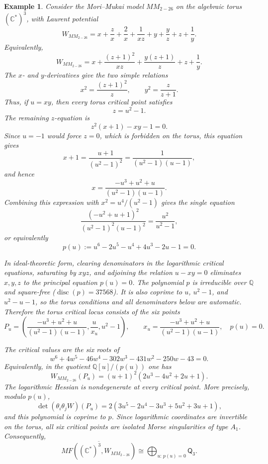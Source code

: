 \documentclass[11pt]{amsart}
\newtheorem{example}{Example}[section]
\newcommand{\MorseCat}[1]{\mathsf{Q}_{#1}}
\begin{document}
\begin{example}
Consider the Mori--Mukai model $MM_{2-26}$ on the algebraic torus
$(\mathbb{C}^*)^3$, with Laurent potential
\[
W_{MM_{2-26}}=x+\frac{z}{x}+\frac{2}{x}+\frac{1}{xz}
+y+\frac{y}{z}+z+\frac{1}{y}.
\]
Equivalently,
\[
W_{MM_{2-26}}
=x+\frac{(z+1)^2}{xz}+\frac{y(z+1)}{z}+z+\frac{1}{y}.
\]
The $x$- and $y$-derivatives give the two simple relations
\[
x^2=\frac{(z+1)^2}{z},
\qquad
y^2=\frac{z}{z+1}.
\]
Thus, if $u=xy$, then every torus critical point satisfies
\[
z=u^2-1.
\]
The remaining $z$-equation is
\[
z^2(x+1)-xy-1=0.
\]
Since $u=-1$ would force $z=0$, which is forbidden on the torus, this equation
gives
\[
x+1=\frac{u+1}{(u^2-1)^2}
=\frac{1}{(u^2-1)(u-1)},
\]
and hence
\[
x=\frac{-u^3+u^2+u}{(u^2-1)(u-1)}.
\]
Combining this expression with $x^2=u^4/(u^2-1)$ gives the single equation
\[
\frac{(-u^2+u+1)^2}{(u^2-1)^2(u-1)^2}
=\frac{u^2}{u^2-1},
\]
or equivalently
\[
p(u):=u^6-2u^5-u^4+4u^3-2u-1=0.
\]

In ideal-theoretic form, clearing denominators in the logarithmic critical
equations, saturating by $xyz$, and adjoining the relation $u-xy=0$ eliminates
$x,y,z$ to the principal equation $p(u)=0$. The polynomial $p$ is irreducible
over $\mathbb{Q}$ and square-free ($\operatorname{disc}(p)=37568$). It is also
coprime to $u$, $u^2-1$, and $u^2-u-1$, so the torus conditions and all
denominators below are automatic. Therefore the torus critical locus consists
of the six points
\[
P_u=\left(
\frac{-u^3+u^2+u}{(u^2-1)(u-1)},
\frac{u}{x_u},
u^2-1
\right),
\qquad
x_u=\frac{-u^3+u^2+u}{(u^2-1)(u-1)},
\quad
p(u)=0.
\]

The critical values are the six roots of
\[
w^6+4w^5-46w^4-302w^3-431w^2-250w-43=0.
\]
Equivalently, in the quotient $\mathbb{Q}[u]/(p(u))$ one has
\[
W_{MM_{2-26}}(P_u)=(u+1)^2(2u^3-4u^2+2u+1).
\]
The logarithmic Hessian is nondegenerate at every critical point. More
precisely, modulo $p(u)$,
\[
\det(\theta_i\theta_jW)(P_u)
=2(3u^5-2u^4-3u^3+5u^2+3u+1),
\]
and this polynomial is coprime to $p$. Since logarithmic coordinates are
invertible on the torus, all six critical points are isolated Morse
singularities of type $A_1$. Consequently,
\[
\overline{MF((\mathbb{C}^*)^3,W_{MM_{2-26}})}
\cong \bigoplus_{u:\,p(u)=0}\MorseCat{3}.
\]
\end{example}
\end{document}
